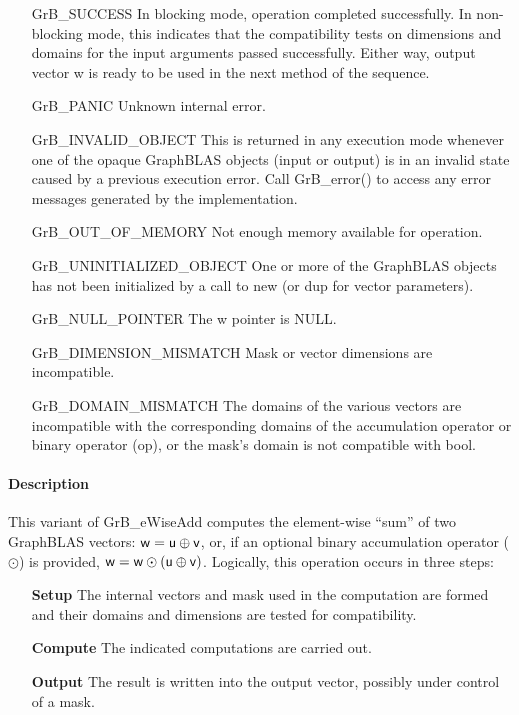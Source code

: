 \begin{itemize}[leftmargin=2.1in]
    \item[{\sf GrB\_SUCCESS}]         In blocking mode, operation
	completed successfully. In non-blocking mode, this indicates
	that the compatibility tests on dimensions and domains for the
	input arguments passed successfully. Either way, output vector
	{\sf w} is ready to be used in the next method of the sequence.

    \item[{\sf GrB\_PANIC}]           Unknown internal error.
    
    \item[{\sf GrB\_INVALID\_OBJECT}] This is returned in any execution mode 
    whenever one of the opaque GraphBLAS objects (input or output) is in an invalid 
    state caused by a previous execution error.  Call {GrB\_error()} to access 
    any error messages generated by the implementation.

    \item[{\sf GrB\_OUT\_OF\_MEMORY}]        Not enough memory available for operation.
    
    \item[{\sf GrB\_UNINITIALIZED\_OBJECT}] One or more of the GraphBLAS objects 
    has not been initialized by a call to {\sf new} (or {\sf dup} for vector
    parameters).
    
    \item[{\sf GrB\_NULL\_POINTER}]  The {\sf w} pointer is {\sf NULL}.

    \item[{\sf GrB\_DIMENSION\_MISMATCH}] Mask or vector dimensions are incompatible.

	\item[{\sf GrB\_DOMAIN\_MISMATCH}]    The domains of the various
	vectors are incompatible with the corresponding domains of the
	accumulation operator or binary operator ({\sf op}), or the mask's domain 
    is not compatible with bool.
\end{itemize}

\paragraph{Description}

This variant of {\sf GrB\_eWiseAdd} computes the element-wise ``sum'' of
two GraphBLAS vectors: ${\sf w} = {\sf u} \oplus {\sf v}$, or, if an optional
binary accumulation operator ($\odot$) is provided, ${\sf w} = {\sf w} \odot
\left({\sf u} \oplus {\sf v}\right)$.  Logically, this operation occurs in
three steps:
\begin{enumerate}[leftmargin=0.75in]
\item[\bf Setup] The internal vectors and mask used in the computation are formed 
and their domains and dimensions are tested for compatibility.
\item[\bf Compute] The indicated computations are carried out.
\item[\bf Output] The result is written into the output vector, possibly under 
control of a mask.
\end{enumerate}


